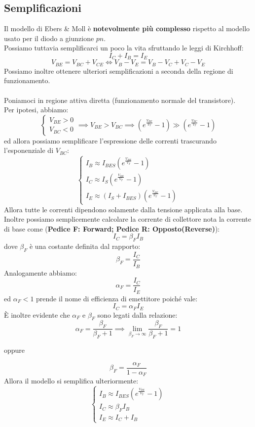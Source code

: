 \documentclass[../main.tex]{subfiles}
\begin{document}
	\subsection{Semplificazioni}
	Il modello di Ebers \& Moll è \textbf{notevolmente più complesso} rispetto al modello usato per il diodo a giunzione $pn$. \\
	Possiamo tuttavia semplificarci un poco la vita sfruttando le leggi di Kirchhoff:
	$$I_C + I_B = I_E$$
	$$V_{BE} = V_{BC} + V_{CE} \iff V_B - V_E = V_B - V_C + V_C - V_E$$
		Possiamo inoltre ottenere ulteriori semplificazioni a seconda della regione di funzionamento.\\\\
	Poniamoci in regione attiva diretta (funzionamento normale del transistore). \\
	Per ipotesi, abbiamo:
	$$\begin{cases} V_{BE} > 0 \\ V_{BC} < 0 \end{cases} \implies V_{BE} > V_{BC} \implies \left( e^{\frac{V_{BE}}{V_T}} - 1 \right) \gg \left( e^{\frac{V_{BC}}{V_T}} - 1 \right)$$
	ed allora possiamo semplificare l’espressione delle correnti trascurando l’esponenziale di $V_{BC}$:
	$$\begin{cases}I_{B}\approx I_{BES}\left(e^{\frac{V_{BE}}{V_{T}}}-1\right)\\I_{C}\approx I_{S}\left(e^{\frac{V_{BE}}{V_{T}}}-1\right)\\I_{E}\approx(I_{S}+I_{BES})\left(e^{\frac{V_{BE}}{V_{T}}}-1\right)\end{cases}$$
	Allora tutte le correnti dipendono solamente dalla tensione applicata alla base. \\
	Inoltre possiamo semplicemente calcolare la corrente di collettore nota la corrente di base come (\textbf{Pedice F: Forward; Pedice R: Opposto(Reverse)}):
	$$I_C = \beta_F I_B$$
	dove $\beta_F$ è una costante definita dal rapporto:
	$$\beta_F = \frac{I_C}{I_B}$$
	Analogamente abbiamo:
	$$\alpha_F = \frac{I_C}{I_E}$$
	ed $\alpha_F < 1$ prende il nome di efficienza di emettitore poiché vale:
	$$I_C = \alpha_F I_E$$
	È inoltre evidente che $\alpha_F$ e $\beta_F$ sono legati dalla relazione:
	$$\alpha_F = \frac{\beta_F}{\beta_F + 1} \implies \lim_{\beta_F \to \infty} \frac{\beta_F}{\beta_F + 1} = 1$$
	\begin{center}
		oppure
	\end{center}
	$$\beta_F = \frac{\alpha_F}{1 - \alpha_F}$$
	Allora il modello si semplifica ulteriormente:
	$$\begin{cases}I_{B}\approx I_{BES}\left(e^{\frac{V_{BE}}{V_{T}}}-1\right)\\I_{C}\approx\beta_{F}I_{B}\\I_{E}\approx I_{C}+I_{B}\end{cases}$$
\end{document}
